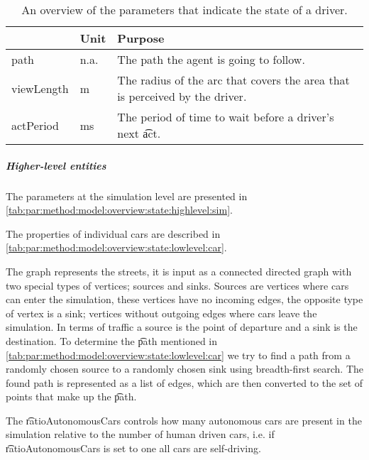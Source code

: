 	\begin{table}
		\centering
		\begin{tabularx}{\textwidth}{>{\ttfamily}llX}
			\toprule
			\normalfont{Parameter}	&Unit & Purpose \\ 
			\midrule
			path					
				& n.a. 
				& The path the agent is going to follow. \\ 
			viewLength 			
				& \si{\meter}
				& The radius of the arc that covers the area that is perceived by the driver.\\ 
			actPeriod
				& \si{\milli\second}
				& The period of time to wait before a driver's next \t{act}. \\
			\bottomrule
		\end{tabularx}
		\caption{An overview of the parameters that indicate the state of a driver.}
		\label{tab:par:method:model:overview:state:lowlevel:driver}
	\end{table}

	\subparagraph{Higher-level entities}
	The parameters at the simulation level are presented in \cref{tab:par:method:model:overview:state:highlevel:sim}.

	The properties of individual cars are described in \cref{tab:par:method:model:overview:state:lowlevel:car}. 

	The graph represents the streets, it is input as a connected directed graph with two special types of vertices; sources and sinks. Sources are vertices where cars can enter the simulation, these vertices have no incoming edges, the opposite type of vertex is a sink; vertices without outgoing edges where cars leave the simulation. In terms of traffic a source is the point of departure and a sink is the destination. To determine the \t{path} mentioned in \cref{tab:par:method:model:overview:state:lowlevel:car} we try to find a path from a randomly chosen source to a randomly chosen sink using breadth-first search. The found path is represented as a list of edges, which are then converted to the set of points that make up the \t{path}.

	The \t{ratioAutonomousCars} controls how many autonomous cars are present in the simulation relative to the number of human driven cars, i.e. if \t{ratioAutonomousCars} is set to one all cars are self-driving.
	
